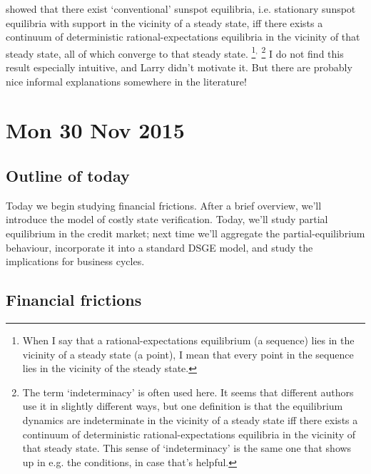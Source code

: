 \documentclass[11pt,letterpaper,reqno,oneside]{article}
\begin{document}
\textcite{Woodford1986} showed that there exist `conventional' sunspot equilibria, i.e. stationary sunspot equilibria with support in the vicinity of a steady state, iff there exists a continuum of deterministic rational-expectations equilibria in the vicinity of that steady state, all of which converge to that steady state.%
	\footnote{When I say that a rational-expectations equilibrium (a sequence) lies in the vicinity of a steady state (a point), I mean that every point in the sequence lies in the vicinity of the steady state.}$^,$%
	\footnote{The term `indeterminacy' is often used here. It seems that different authors use it in slightly different ways, but one definition is that the equilibrium dynamics are indeterminate in the vicinity of a steady state iff there exists a continuum of deterministic rational-expectations equilibria in the vicinity of that steady state. This sense of `indeterminacy' is the same one that shows up in e.g. the \textcite{BlanchardKahn1980} conditions, in case that's helpful.}
I do not find this result especially intuitive, and Larry didn't motivate it. But there are probably nice informal explanations somewhere in the literature!



\pagebreak
\section{Mon 30 Nov 2015}
\label{sec:30Nov2015}


\subsection{Outline of today}
\label{sec:30Nov2015:outline_of_today}

Today we begin studying financial frictions. After a brief overview, we'll introduce the \textcite{BernankeGertlerGilchrist1999} model of costly state verification. Today, we'll study partial equilibrium in the credit market; next time we'll aggregate the partial-equilibrium behaviour, incorporate it into a standard DSGE model, and study the implications for business cycles.



\subsection{Financial frictions}
\label{sec:30Nov2015:financial_frictions}
\end{document}
